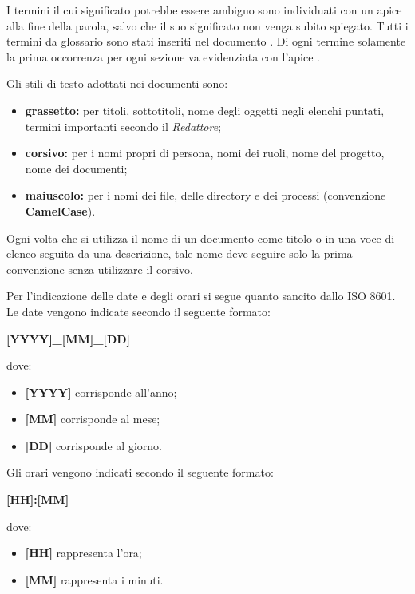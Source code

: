 I termini il cui significato potrebbe essere ambiguo sono individuati con un apice  alla fine della parola, salvo che il suo significato non venga subito spiegato. Tutti i termini da glossario sono stati inseriti nel documento \Glossario. Di ogni termine solamente la prima occorrenza per ogni sezione va evidenziata con l'apice .

Gli stili di testo adottati nei documenti sono:
\begin{itemize}
	\item \textbf{grassetto:} per titoli, sottotitoli, nome degli oggetti negli elenchi puntati, termini importanti secondo il \textit{Redattore};
	\item \textbf{corsivo:} per i nomi propri di persona, nomi dei ruoli, nome del progetto, nome dei documenti;
	\item \textbf{maiuscolo:} per i nomi dei file, delle directory e dei processi (convenzione \textbf{CamelCase}).	
\end{itemize}
Ogni volta che si utilizza il nome di un documento come titolo o in una voce di elenco seguita da una descrizione, tale nome deve seguire solo la prima convenzione senza utilizzare il corsivo.

Per l'indicazione delle date e degli orari si segue quanto sancito dallo  ISO 8601.\\
Le date vengono indicate secondo il seguente formato:
\begin{center}
	\textbf{[YYYY]\_[MM]\_[DD]} 
\end{center}
dove:
\begin{itemize}
	\item \textbf{[YYYY]} corrisponde all'anno;
	\item \textbf{[MM]} corrisponde al mese;
	\item \textbf{[DD]} corrisponde al giorno.
\end{itemize}
Gli orari vengono indicati secondo il seguente formato:
\begin{center}
	\textbf{[HH]:[MM]} 
\end{center}
dove:
\begin{itemize}
	\item \textbf{[HH]} rappresenta l'ora;
	\item \textbf{[MM]} rappresenta i minuti.
\end{itemize}

